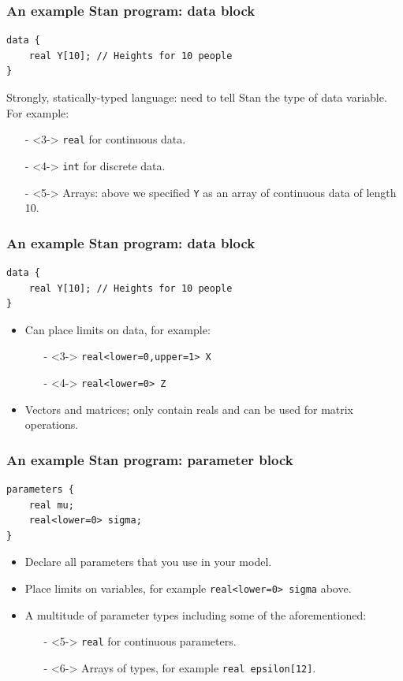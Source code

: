 \documentclass[handout]{beamer}
\begin{document}
\begin{frame}[fragile]
\frametitle{An example Stan program: data block}
\begin{verbatim}
data {
    real Y[10]; // Heights for 10 people
}
\end{verbatim}

 Strongly, statically-typed language: need to tell Stan the type of data variable. For example:
\begin{itemize}
\item[-]<3-> \texttt{real} for continuous data.
\item[-]<4-> \texttt{int} for discrete data.
\item[-]<5-> Arrays: above we specified \texttt{Y} as an array of continuous data of length 10.
\end{itemize}

\end{frame}

\begin{frame}[fragile]
\frametitle{An example Stan program: data block}
\begin{verbatim}
data {
    real Y[10]; // Heights for 10 people
}
\end{verbatim}

\begin{itemize}
\item<2-> Can place limits on data, for example:
\begin{itemize}
	\item[-]<3-> \texttt{real<lower=0,upper=1> X}
	\item[-]<4-> \texttt{real<lower=0> Z}
\end{itemize}
\item<5-> Vectors and matrices; only contain reals and can be used for matrix operations. 
\end{itemize}

\end{frame}

\begin{frame}[fragile]
\frametitle{An example Stan program: parameter block}
\begin{verbatim}
parameters {
    real mu;
    real<lower=0> sigma;
}
\end{verbatim}
\begin{itemize}
\item<2-> Declare all parameters that you use in your model.
\item<3-> Place limits on variables, for example  \texttt{real<lower=0> sigma} above.
\item<4-> A multitude of parameter types including some of the aforementioned:
\begin{itemize}
\item[-]<5-> \texttt{real} for continuous parameters.
\item[-]<6-> Arrays of types, for example \texttt{real epsilon[12]}.
\end{itemize}
\end{itemize}

\end{frame}
\end{document}
